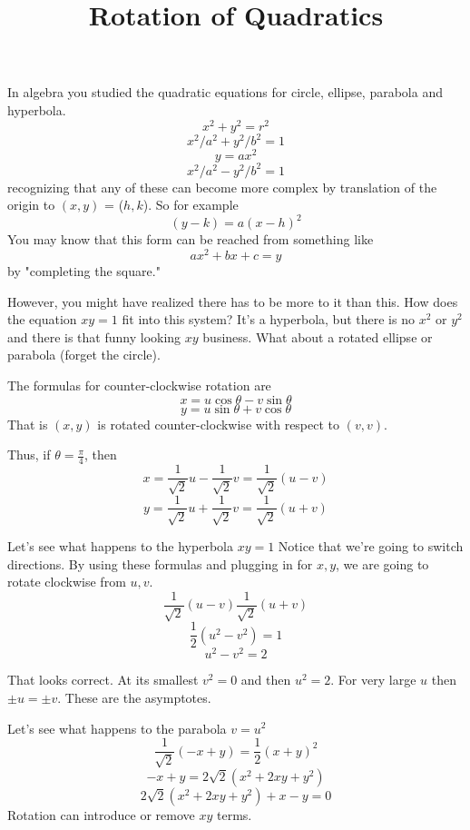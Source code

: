 \documentclass[11pt, oneside]{article}   	%
\title{Rotation of Quadratics}
\date{}							%
\begin{document}
\maketitle
\large
In algebra you studied the quadratic equations for circle, ellipse, parabola and hyperbola.
\[x^2 + y^2 = r^2 \]
\[x^2/a^2 + y^2/b^2 = 1 \]
\[y = ax^2 \]
\[x^2/a^2 - y^2/b^2 = 1 \]
recognizing that any of these can become more complex by translation of the origin to $(x,y)$ = ($h,k$).  So for example
\[(y-k) = a(x-h)^2 \]
You may know that this form can be reached from something like
\[ ax^2 + bx + c = y \]
by "completing the square."

However, you might have realized there has to be more to it than this.  How does the equation $xy=1$ fit into this system?  It's a hyperbola, but there is no $x^2$ or $y^2$ and there is that funny looking $xy$ business.  What about a rotated ellipse or parabola (forget the circle).

The formulas for counter-clockwise rotation are
\[ x = u \cos \theta - v \sin \theta \]
\[ y = u \sin \theta + v \cos \theta \]
That is $(x,y)$ is rotated counter-clockwise with respect to $(v,v)$.

Thus, if $\theta = \frac{\pi}{4}$, then
\[ x = \frac{1}{\sqrt{2}}u - \frac{1}{\sqrt{2}}v = \frac{1}{\sqrt{2}} (u - v) \]
\[ y = \frac{1}{\sqrt{2}}u + \frac{1}{\sqrt{2}}v = \frac{1}{\sqrt{2}} (u + v) \]

Let's see what happens to the hyperbola $xy=1$  Notice that we're going to switch directions.  By using these formulas and plugging in for $x,y$, we are going to rotate clockwise from $u,v$.
\[ \frac{1}{\sqrt{2}} (u - v) \frac{1}{\sqrt{2}} (u + v) \]
\[ \frac{1}{2} (u^2 - v^2) = 1 \]
\[ u^2 - v^2 = 2 \]

That looks correct.  At its smallest $v^2=0$ and then $u^2=2$.  For very large $u$ then $\pm u =\pm v$.  These are the asymptotes.

Let's see what happens to the parabola $v=u^2$
\[ \frac{1}{\sqrt{2}} (-x + y) = \frac{1}{2} (x + y)^2 \]
\[ -x + y = 2\sqrt{2} (x^2 + 2xy + y^2) \]
\[ 2\sqrt{2} (x^2 + 2xy + y^2) + x - y = 0 \]
Rotation can introduce or remove $xy$ terms.
\end{document}
